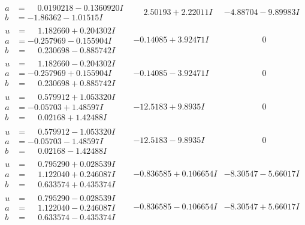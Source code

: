 \documentclass[1p]{elsarticle_modified}
\theoremstyle{definition}
\begin{document}
$$\begin{array}{c|c|c}
\begin{aligned}
a &= \phantom{-}0.0190218 - 0.1360920 I \\
b &= -1.86362 - 1.01515 I\end{aligned}
 & \phantom{-}2.50193 + 2.22011 I & -4.88704 - 9.89983 I \\ \hline\begin{aligned}
u &= \phantom{-}1.182660 + 0.204302 I \\
a &= -0.257969 - 0.155904 I \\
b &= \phantom{-}0.230698 - 0.885742 I\end{aligned}
 & -0.14085 + 3.92471 I & \phantom{-0.000000 } 0 \\ \hline\begin{aligned}
u &= \phantom{-}1.182660 - 0.204302 I \\
a &= -0.257969 + 0.155904 I \\
b &= \phantom{-}0.230698 + 0.885742 I\end{aligned}
 & -0.14085 - 3.92471 I & \phantom{-0.000000 } 0 \\ \hline\begin{aligned}
u &= \phantom{-}0.579912 + 1.053320 I \\
a &= -0.05703 + 1.48597 I \\
b &= \phantom{-}0.02168 + 1.42488 I\end{aligned}
 & -12.5183 + 9.8935 I & \phantom{-0.000000 } 0 \\ \hline\begin{aligned}
u &= \phantom{-}0.579912 - 1.053320 I \\
a &= -0.05703 - 1.48597 I \\
b &= \phantom{-}0.02168 - 1.42488 I\end{aligned}
 & -12.5183 - 9.8935 I & \phantom{-0.000000 } 0 \\ \hline\begin{aligned}
u &= \phantom{-}0.795290 + 0.028539 I \\
a &= \phantom{-}1.122040 + 0.246087 I \\
b &= \phantom{-}0.633574 + 0.435374 I\end{aligned}
 & -0.836585 + 0.106654 I & -8.30547 - 5.66017 I \\ \hline\begin{aligned}
u &= \phantom{-}0.795290 - 0.028539 I \\
a &= \phantom{-}1.122040 - 0.246087 I \\
b &= \phantom{-}0.633574 - 0.435374 I\end{aligned}
 & -0.836585 - 0.106654 I & -8.30547 + 5.66017 I \\ \hline\begin{aligned}

\end{aligned}
\end{array}$$
\end{document}
